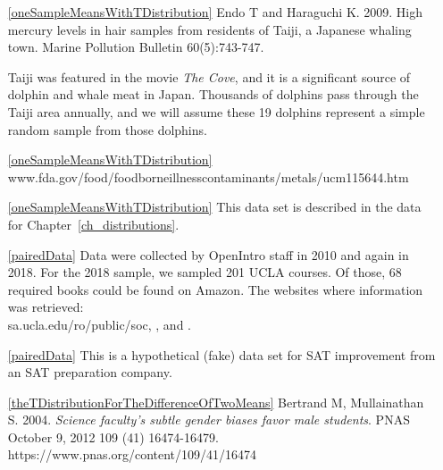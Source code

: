 \D{\newpage}


\begin{itemize}
\item[\ref{oneSampleMeansWithTDistribution}]
    Endo T and Haraguchi K. 2009.
    High mercury levels in hair samples from residents of Taiji,
    a Japanese whaling town.
    Marine Pollution Bulletin 60(5):743-747.

    Taiji was featured in the movie
    \emph{The Cove}, and it is a significant source of dolphin
    and whale meat in Japan.
    Thousands of dolphins pass through the Taiji area annually,
    and we will assume these 19 dolphins represent a simple
    random sample from those dolphins.
\item[\ref{oneSampleMeansWithTDistribution}]
        {www.fda.gov/food/foodborneillnesscontaminants/metals/ucm115644.htm}

\item[\ref{oneSampleMeansWithTDistribution}]
    This data set is described in
    the data for Chapter~\ref{ch_distributions}.

\item[\ref{pairedData}]
    Data were collected by OpenIntro staff in 2010 and again
    in 2018.
    For the 2018 sample, we sampled 201 UCLA courses.
    Of those, 68 required books could be
    found on Amazon.
    The websites where information was retrieved: \\
        {sa.ucla.edu/ro/public/soc},
    ,
    and .

\item[\ref{pairedData}]
    This is a hypothetical (fake) data set for SAT improvement from
    an SAT preparation company.

\item[\ref{theTDistributionForTheDifferenceOfTwoMeans}]
    Bertrand M, Mullainathan S. 2004.
    \emph{Science faculty's subtle gender biases favor male students}.
    PNAS October 9, 2012 109 (41) 16474-16479.\\
        {https://www.pnas.org/content/109/41/16474}


\end{itemize}
